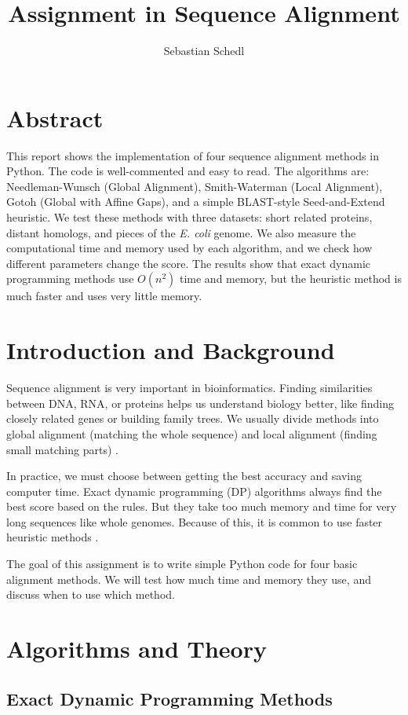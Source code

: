 \documentclass[Assignment,MME,english]{twbook}
\title{Assignment in Sequence Alignment}
\author{Sebastian Schedl}
\begin{document}
\maketitle

\chapter*{Abstract}
This report shows the implementation of four sequence alignment methods in Python. The code is well-commented and easy to read. The algorithms are: Needleman-Wunsch (Global Alignment), Smith-Waterman (Local Alignment), Gotoh (Global with Affine Gaps), and a simple BLAST-style Seed-and-Extend heuristic. We test these methods with three datasets: short related proteins, distant homologs, and pieces of the \textit{E. coli} genome. We also measure the computational time and memory used by each algorithm, and we check how different parameters change the score. The results show that exact dynamic programming methods use $O(n^2)$ time and memory, but the heuristic method is much faster and uses very little memory.

\chapter{Introduction and Background}
Sequence alignment is very important in bioinformatics. Finding similarities between DNA, RNA, or proteins helps us understand biology better, like finding closely related genes or building family trees. We usually divide methods into global alignment (matching the whole sequence) and local alignment (finding small matching parts) \cite{needleman1970,smith1981}.

In practice, we must choose between getting the best accuracy and saving computer time. Exact dynamic programming (DP) algorithms always find the best score based on the rules. But they take too much memory and time for very long sequences like whole genomes. Because of this, it is common to use faster heuristic methods \cite{altschul1990}.

The goal of this assignment is to write simple Python code for four basic alignment methods. We will test how much time and memory they use, and discuss when to use which method.

\chapter{Algorithms and Theory}

\section{Exact Dynamic Programming Methods}
\end{document}
